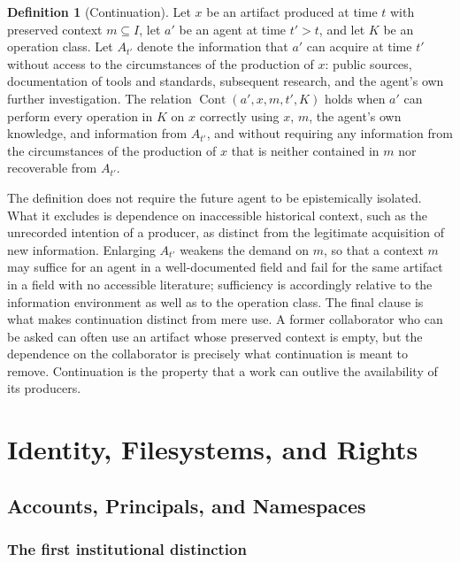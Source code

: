 \documentclass[11pt,twoside,openright]{book}
\theoremstyle{plain}
\theoremstyle{definition}
\newtheorem{definition}[theorem]{Definition}
\theoremstyle{remark}
\newcommand{\Cont}{\operatorname{Cont}}
\begin{document}
\begin{definition}[Continuation]\label{def:continuation}
Let $x$ be an artifact produced at time $t$ with preserved context $m\subseteq I$, let $a'$ be an agent at time $t'>t$, and let $K$ be an operation class. Let $A_{t'}$ denote the information that $a'$ can acquire at time $t'$ without access to the circumstances of the production of $x$: public sources, documentation of tools and standards, subsequent research, and the agent's own further investigation. The relation $\Cont(a',x,m,t',K)$ holds when $a'$ can perform every operation in $K$ on $x$ correctly using $x$, $m$, the agent's own knowledge, and information from $A_{t'}$, and without requiring any information from the circumstances of the production of $x$ that is neither contained in $m$ nor recoverable from $A_{t'}$.
\end{definition}

The definition does not require the future agent to be epistemically isolated. What it excludes is dependence on inaccessible historical context, such as the unrecorded intention of a producer, as distinct from the legitimate acquisition of new information. Enlarging $A_{t'}$ weakens the demand on $m$, so that a context $m$ may suffice for an agent in a well-documented field and fail for the same artifact in a field with no accessible literature; sufficiency is accordingly relative to the information environment as well as to the operation class. The final clause is what makes continuation distinct from mere use. A former collaborator who can be asked can often use an artifact whose preserved context is empty, but the dependence on the collaborator is precisely what continuation is meant to remove. Continuation is the property that a work can outlive the availability of its producers.

\part{Identity, Filesystems, and Rights}\label{part:identity}

\chapter{Accounts, Principals, and Namespaces}\label{ch:accounts}

\section{The first institutional distinction}
\end{document}
